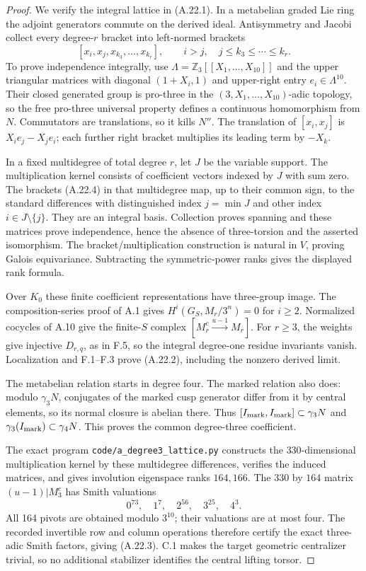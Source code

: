 \begin{proof}
We verify the integral lattice in (A.22.1). In a metabelian
graded Lie ring the adjoint generators commute on the derived
ideal. Antisymmetry and Jacobi collect every degree-$r$ bracket
into left-normed brackets
\[
 [x_i,x_j,x_{k_3},\ldots,x_{k_r}],\qquad
 i>j,\quad j\le k_3\le\cdots\le k_r.                 \tag{A.22.4}
\]
To prove independence integrally, use
$\Lambda=\mathbb Z_3[[X_1,\ldots,X_{10}]]$ and the upper
triangular matrices with diagonal $(1+X_i,1)$ and upper-right
entry $e_i\in\Lambda^{10}$. Their closed generated group is
pro-three in the $(3,X_1,\ldots,X_{10})$-adic topology, so
the free pro-three universal property defines a continuous
homomorphism from $N$. Commutators are translations, so it
kills $N''$. The translation of $[x_i,x_j]$ is
$X_i e_j-X_j e_i$; each further right bracket multiplies
its leading term by $-X_k$.

In a fixed multidegree of total degree $r$, let $J$ be the
variable support. The multiplication kernel consists of
coefficient vectors indexed by $J$ with sum zero. The brackets
(A.22.4) in that multidegree map, up to their common sign, to
the standard differences with distinguished index $j=\min J$
and other index $i\in J\setminus\{j\}$. They are an integral
basis. Collection proves spanning and these matrices prove
independence, hence the absence of three-torsion and the
asserted isomorphism. The bracket/multiplication construction
is natural in $V$, proving Galois equivariance. Subtracting
the symmetric-power ranks gives the displayed rank formula.

Over $K_0$ these finite coefficient representations have
three-group image. The composition-series proof of A.1 gives
$H^i(G_S,M_r/3^n)=0$ for $i\ge2$. Normalized cocycles of
A.10 give the finite-$S$ complex
$[M_r^c\xrightarrow{u-1}M_r]$. For $r\ge3$, the weights
give injective $D_{r,q}$, as in F.5, so the integral
degree-one residue invariants vanish. Localization and
F.1--F.3 prove (A.22.2), including the nonzero derived limit.

The metabelian relation starts in degree four. The marked
relation also does: modulo $\gamma_3N$, conjugates of the
marked cusp generator differ from it by central elements,
so its normal closure is abelian there. Thus
$[I_{\rm mark},I_{\rm mark}]\subset\gamma_3N$ and
$\gamma_3(I_{\rm mark})\subset\gamma_4N$.
This proves the common degree-three coefficient.

The exact program \texttt{code/a\_degree3\_lattice.py}
constructs the $330$-dimensional multiplication kernel by
these multidegree differences, verifies the induced matrices,
and gives involution eigenspace ranks $164,166$.
The $330$ by $164$ matrix $(u-1)|M_3^c$ has Smith valuations
\[
 0^{73},\quad1^7,\quad2^{56},\quad3^{25},\quad4^3.
\]
All 164 pivots are obtained modulo $3^{10}$; their valuations
are at most four. The recorded invertible row and column
operations therefore certify the exact three-adic Smith
factors, giving (A.22.3). C.1 makes the target geometric
centralizer trivial, so no additional stabilizer identifies
the central lifting torsor.
\end{proof}

